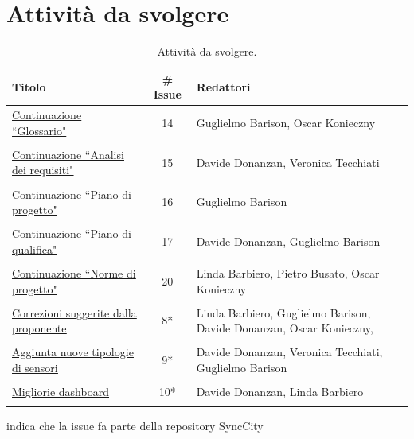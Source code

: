 \documentclass[8pt]{article}
\begin{document}
\section{Attività da svolgere}
\begin{table}[ht!]
	\centering
	\begin{tabular}{p{7cm}cp{7cm}}
		\toprule
		\textbf{Titolo} & \textbf{\# Issue} & \textbf{Redattori} \\
		\midrule
		\href{https://github.com/NaN1fy/docs/issues/14}{\underline{Continuazione ``Glossario"}} & 14 & Guglielmo Barison, Oscar Konieczny\\\\
		\href{https://github.com/NaN1fy/docs/issues/15}{\underline{Continuazione ``Analisi dei requisiti"}} & 15 & Davide Donanzan, Veronica Tecchiati\\\\
		\href{https://github.com/NaN1fy/docs/issues/16}{\underline{Continuazione ``Piano di progetto"}}  & 16 & Guglielmo Barison\\\\
		\href{https://github.com/NaN1fy/docs/issues/17}{\underline{Continuazione ``Piano di qualifica"}} & 17 & Davide Donanzan, Guglielmo Barison\\\\
		\href{https://github.com/NaN1fy/docs/issues/20}{\underline{Continuazione ``Norme di progetto"}} & 20 & Linda Barbiero, Pietro Busato, Oscar Konieczny\\\\
        \href{https://github.com/NaN1fy/SyncCity/issues/8}{\underline{Correzioni suggerite dalla proponente}} & 8*\tnote{*} & Linda Barbiero, Guglielmo Barison, Davide Donanzan, Oscar Konieczny, \\\\
        \href{https://github.com/NaN1fy/SyncCity/issues/9}{\underline{Aggiunta nuove tipologie di sensori}} & 9*\tnote{*} & Davide Donanzan, Veronica Tecchiati, Guglielmo Barison\\\\
		\href{https://github.com/NaN1fy/SyncCity/issues/10}{\underline{Migliorie dashboard}} & 10*\tnote{*} & Davide Donanzan, Linda Barbiero\\\\
		\bottomrule
	\end{tabular}
	\begin{tablenotes}
		\vspace{1em}
		\item * indica che la issue fa parte della repository SyncCity
	\end{tablenotes}
	\caption{Attività da svolgere.}
	\label{table:Attivita da svolgere}
\end{table}
\end{document}
